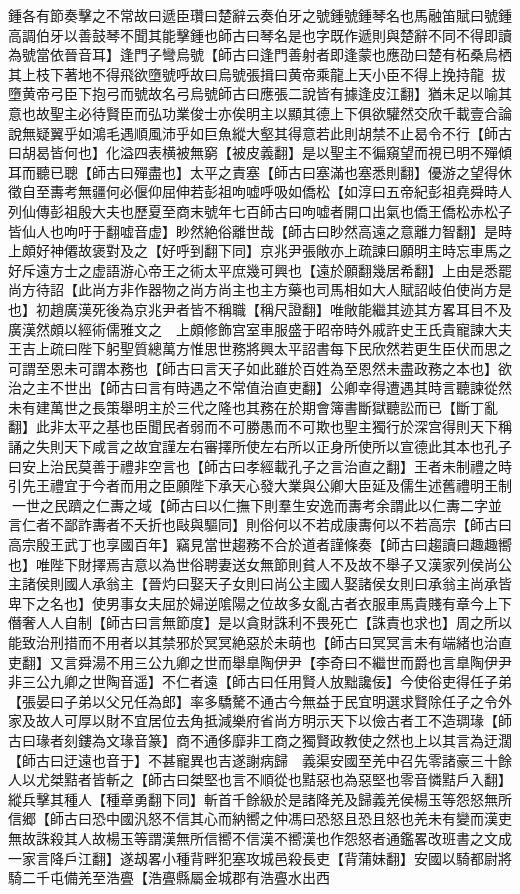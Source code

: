 鍾各有節奏擊之不常故曰遞臣瓚曰楚辭云奏伯牙之號鍾號鍾琴名也馬融笛賦曰號鍾高調伯牙以善鼓琴不聞其能擊鍾也師古曰琴名是也字既作遞則與楚辭不同不得即讀為號當依晉音耳】逢門子彎烏號【師古曰逢門善射者即逢蒙也應劭曰楚有柘桑烏栖其上枝下著地不得飛欲墮號呼故曰烏號張揖曰黄帝乘龍上天小臣不得上挽持龍拔墮黄帝弓臣下抱弓而號故名弓烏號師古曰應張二說皆有據逢皮江翻】猶未足以喻其意也故聖主必待賢臣而弘功業俊士亦俟明主以顯其德上下俱欲驩然交欣千載壹合論說無疑翼乎如鴻毛遇順風沛乎如巨魚縱大壑其得意若此則胡禁不止曷令不行【師古曰胡曷皆何也】化溢四表横被無窮【被皮義翻】是以聖主不徧窺望而視已明不殫傾耳而聽已聰【師古曰殫盡也】太平之責塞【師古曰塞滿也塞悉則翻】優游之望得休徵自至夀考無疆何必偃仰屈伸若彭祖呴嘘呼吸如僑松【如淳曰五帝紀彭祖堯舜時人列仙傳彭祖殷大夫也歷夏至商末號年七百師古曰呴嘘者開口出氣也僑王僑松赤松子皆仙人也呴吁于翻嘘音虚】眇然絶俗離世哉【師古曰眇然高遠之意離力智翻】是時上頗好神僊故褒對及之【好呼到翻下同】京兆尹張敞亦上疏諫曰願明主時忘車馬之好斥遠方士之虚語游心帝王之術太平庶幾可興也【遠於願翻幾居希翻】上由是悉罷尚方待詔【此尚方非作器物之尚方尚主也主方藥也司馬相如大人賦詔岐伯使尚方是也】初趙廣漢死後為京兆尹者皆不稱職【稱尺證翻】唯敞能繼其迹其方畧耳目不及廣漢然頗以經術儒雅文之　上頗修飾宫室車服盛于昭帝時外戚許史王氏貴寵諫大夫王吉上疏曰陛下躬聖質總萬方惟思世務將興太平詔書每下民欣然若更生臣伏而思之可謂至恩未可謂本務也【師古曰言天子如此雖於百姓為至恩然未盡政務之本也】欲治之主不世出【師古曰言有時遇之不常值治直吏翻】公卿幸得遭遇其時言聽諫從然未有建萬世之長策舉明主於三代之隆也其務在於期會簿書斷獄聽訟而已【斷丁亂翻】此非太平之基也臣聞民者弱而不可勝愚而不可欺也聖主獨行於深宫得則天下稱誦之失則天下咸言之故宜謹左右審擇所使左右所以正身所使所以宣德此其本也孔子曰安上治民莫善于禮非空言也【師古曰孝經載孔子之言治直之翻】王者未制禮之時引先王禮宜于今者而用之臣願陛下承天心發大業與公卿大臣延及儒生述舊禮明王制一世之民躋之仁夀之域【師古曰以仁撫下則羣生安逸而夀考余謂此以仁夀二字並言仁者不鄙詐夀者不夭折也敺與驅同】則俗何以不若成康夀何以不若高宗【師古曰高宗殷王武丁也享國百年】竊見當世趨務不合於道者謹條奏【師古曰趨讀曰趣趣嚮也】唯陛下財擇焉吉意以為世俗聘妻送女無節則貧人不及故不舉子又漢家列侯尚公主諸侯則國人承翁主【晉灼曰娶天子女則曰尚公主國人娶諸侯女則曰承翁主尚承皆卑下之名也】使男事女夫屈於婦逆隂陽之位故多女亂古者衣服車馬貴賤有章今上下僭奢人人自制【師古曰言無節度】是以貪財誅利不畏死亡【誅責也求也】周之所以能致治刑措而不用者以其禁邪於冥冥絶惡於未萌也【師古曰冥冥言未有端緒也治直吏翻】又言舜湯不用三公九卿之世而舉臯陶伊尹【李奇曰不繼世而爵也言臯陶伊尹非三公九卿之世陶音遥】不仁者遠【師古曰任用賢人放黜讒佞】今使俗吏得任子弟【張晏曰子弟以父兄任為郎】率多驕驁不通古今無益于民宜明選求賢除任子之令外家及故人可厚以財不宜居位去角抵減樂府省尚方明示天下以儉古者工不造琱瑑【師古曰瑑者刻鏤為文瑑音篆】商不通侈靡非工商之獨賢政教使之然也上以其言為迂濶【師古曰迂遠也音于】不甚寵異也吉遂謝病歸　義渠安國至羌中召先零諸豪三十餘人以尤桀黠者皆斬之【師古曰桀堅也言不順從也黠惡也為惡堅也零音憐黠戶入翻】縱兵擊其種人【種章勇翻下同】斬首千餘級於是諸降羌及歸義羌侯楊玉等怨怒無所信郷【師古曰恐中國汎怒不信其心而納嚮之仲馮曰恐怒且恐且怒也羌未有變而漢吏無故誅殺其人故楊玉等謂漢無所信嚮不信漢不嚮漢也作怨怒者通鑑畧改班書之文成一家言降戶江翻】遂刼畧小種背畔犯塞攻城邑殺長吏【背蒲妹翻】安國以騎都尉將騎二千屯備羌至浩亹【浩亹縣屬金城郡有浩亹水出西